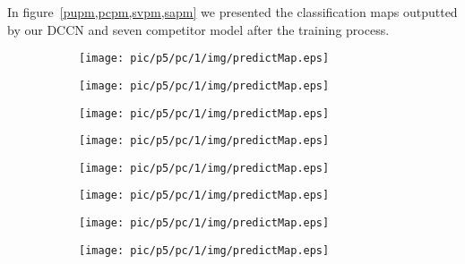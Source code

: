\documentclass{article}
\begin{document}
	In figure~\ref{pupm,pcpm,svpm,sapm} we presented the classification maps outputted by our DCCN and seven competitor
	model after the training process.
	\begin{figure}
		\begin{subfigure}{0.125\textwidth}
			\texttt{[image: pic/p5/pc/1/img/predictMap.eps]}
			\caption{}
		\end{subfigure}
		\begin{subfigure}{0.125\textwidth}
			\texttt{[image: pic/p5/pc/1/img/predictMap.eps]}
			\caption{}
		\end{subfigure}
		\begin{subfigure}{0.125\textwidth}
			\texttt{[image: pic/p5/pc/1/img/predictMap.eps]}
			\caption{}
		\end{subfigure}
		\begin{subfigure}{0.125\textwidth}
			\texttt{[image: pic/p5/pc/1/img/predictMap.eps]}
			\caption{}
		\end{subfigure}
		\begin{subfigure}{0.125\textwidth}
			\texttt{[image: pic/p5/pc/1/img/predictMap.eps]}
			\caption{}
		\end{subfigure}
		\begin{subfigure}{0.125\textwidth}
			\texttt{[image: pic/p5/pc/1/img/predictMap.eps]}
			\caption{}
		\end{subfigure}
		\begin{subfigure}{0.125\textwidth}
			\texttt{[image: pic/p5/pc/1/img/predictMap.eps]}
			\caption{}
		\end{subfigure}
		\begin{subfigure}{0.125\textwidth}
			\texttt{[image: pic/p5/pc/1/img/predictMap.eps]}
			\caption{}
		\end{subfigure}
		\label{pcpm}
	\end{figure}
\end{document}

